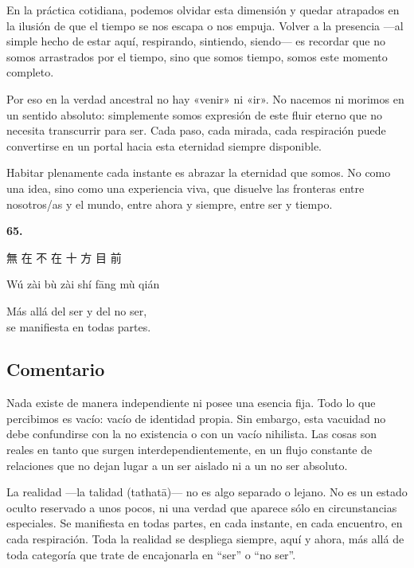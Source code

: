 \documentclass[
  a5paperpaper,
]{article}
\begin{document}
En la práctica cotidiana, podemos olvidar esta dimensión y quedar
atrapados en la ilusión de que el tiempo se nos escapa o nos empuja.
Volver a la presencia ---al simple hecho de estar aquí, respirando,
sintiendo, siendo--- es recordar que no somos arrastrados por el tiempo,
sino que somos tiempo, somos este momento completo.

Por eso en la verdad ancestral no hay «venir» ni «ir». No nacemos ni
morimos en un sentido absoluto: simplemente somos expresión de este
fluir eterno que no necesita transcurrir para ser. Cada paso, cada
mirada, cada respiración puede convertirse en un portal hacia esta
eternidad siempre disponible.

Habitar plenamente cada instante es abrazar la eternidad que somos. No
como una idea, sino como una experiencia viva, que disuelve las
fronteras entre nosotros/as y el mundo, entre ahora y siempre, entre ser
y tiempo.

\hfill\break

\hypertarget{05}{}
\begin{verseblock}

\newpage

\begin{center}\textbf{65.}\end{center}

無 在 不 在 十 方 目 前

Wú zài bù zài shí fāng mù qián

Más allá del ser y del no ser,\\
se manifiesta en todas partes.

\end{verseblock}

\hfill\break

\hypertarget{comentario-64}{%
\subsection{Comentario}\label{comentario-64}}

Nada existe de manera independiente ni posee una esencia fija. Todo lo
que percibimos es vacío: vacío de identidad propia. Sin embargo, esta
vacuidad no debe confundirse con la no existencia o con un vacío
nihilista. Las cosas son reales en tanto que surgen
interdependientemente, en un flujo constante de relaciones que no dejan
lugar a un ser aislado ni a un no ser absoluto.

La realidad ---la talidad (tathatā)--- no es algo separado o lejano. No
es un estado oculto reservado a unos pocos, ni una verdad que aparece
sólo en circunstancias especiales. Se manifiesta en todas partes, en
cada instante, en cada encuentro, en cada respiración. Toda la realidad
se despliega siempre, aquí y ahora, más allá de toda categoría que trate
de encajonarla en ``ser'' o ``no ser''.
\end{document}
